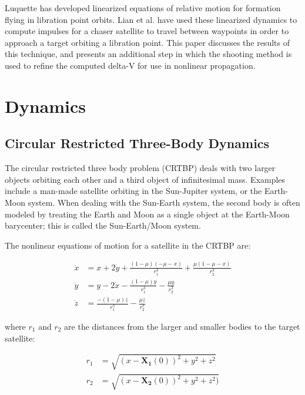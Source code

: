 \documentclass[]{article}
\begin{document}
Luquette has developed linearized equations of relative motion for formation flying in libration point orbits.  Lian et al. have used these linearized dynamics to compute impulses for a chaser satellite to travel between waypoints in order to approach a target orbiting a libration point.  This paper discusses the results of this technique, and presents an additional step in which the shooting method is used to refine the computed delta-V for use in nonlinear propagation.

\section{Dynamics}

\subsection{Circular Restricted Three-Body Dynamics}
The circular restricted three body problem (CRTBP) deals with two larger objects orbiting each other and a third object of infinitesimal mass.  Examples include a man-made satellite orbiting in the Sun-Jupiter system, or the Earth-Moon system.  When dealing with the Sun-Earth system, the second body is often modeled by treating the Earth and Moon as a single object at the Earth-Moon barycenter; this is called the Sun-Earth/Moon system.

The nonlinear equations of motion for a satellite in the CRTBP are:

\begin{equation} \label{eq:CRTBP}
\begin{aligned}
\ddot{x} &= x + 2\dot{y} + \frac{(1 - \mu)(-\mu - x)}{r_1^3} + \frac{\mu(1 - \mu - x)}{r_2^3} \\
\ddot{y} &= y - 2\dot{x} - \frac{(1 - \mu)y}{r_1^3} - \frac{\mu y}{r_2^3} \\
\ddot{z} &= \frac{-(1 - \mu)z}{r_1^3} - \frac{\mu z}{r_2^3}
\end{aligned}
\end{equation}

where \(r_1\) and \(r_2\) are the distances from the larger and smaller bodies to the target satellite:

\begin{equation*}
\begin{aligned}
r_1 &= \sqrt{(x-\mathbf{X_1}(0))^2 + y^2 + z^2} \\
r_2 &= \sqrt{(x-\mathbf{X_2}(0))^2 + y^2 + z^2)}
\end{aligned}
\end{equation*}
\end{document}
